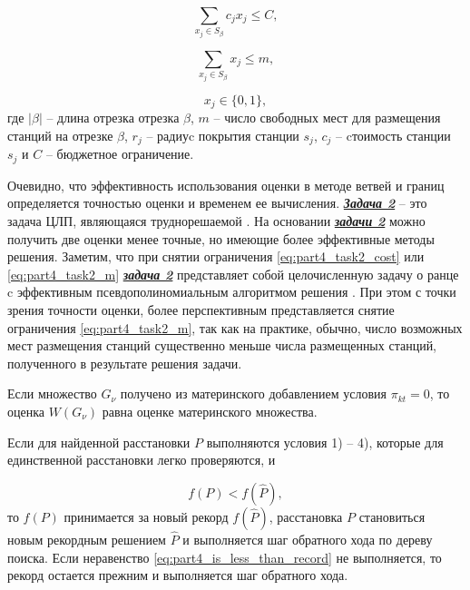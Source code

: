 \begin{equation}\label{eq:part4_task2_cost}
    \sum\limits_{x_j \in S_\beta} c_j x_j \leqslant C,
\end{equation}

\begin{equation}\label{eq:part4_task2_m}
    \sum\limits_{x_j \in S_\beta} x_j \leqslant m,
\end{equation}

\begin{displaymath}
    x_j \in \{0, 1\},
\end{displaymath}
где $|\beta|$ -- длина отрезка отрезка  $\beta$, $m$ -- число свободных мест для размещения станций на отрезке $\beta$, $r_j$ -- радиуc покрытия станции $s_j$, $c_j$ -- cтоимость станции $s_j$ и $C$ -- бюджетное ограничение.

Очевидно, что эффективность использования оценки в методе ветвей и границ определяется точностью оценки и временем ее вычисления. \underline{\textit{\textbf{Задача 2}}} -- это задача ЦЛП, являющаяся труднорешаемой \cite{Gari}. На основании \underline{\textit{\textbf{задачи 2}}} можно получить две оценки менее точные, но имеющие более эффективные методы решения. Заметим, что при снятии ограничения \cref{eq:part4_task2_cost} или \cref{eq:part4_task2_m} \underline{\textit{\textbf{задача 2}}} представляет собой целочисленную задачу о ранце c эффективным псевдополиномиальным алгоритмом решения \cite{Gari}. При этом с точки зрения точности оценки, более перспективным представляется снятие ограничения \cref{eq:part4_task2_m}, так как на практике, обычно, число возможных мест размещения станций существенно меньше числа размещенных станций, полученного в результате решения задачи. 

Если множество $G_\nu$ получено из материнского добавлением условия $\pi_{kt}=0$, то оценка $W(G_\nu)$ равна оценке материнского множества.

Если для найденной расстановки $P$ выполняются условия 1) – 4), которые для единственной расстановки легко проверяются, и

\begin{equation}
    \label{eq:part4_is_less_than_record}
    f(P) < f(\widehat{P}),
\end{equation}
то $f(P)$ принимается за новый рекорд $f(\widehat{P})$, расстановка $P$ становиться новым рекордным решением $\widehat{P}$ и выполняется шаг обратного хода по дереву поиска. Если неравенство \cref{eq:part4_is_less_than_record} не выполняется, то рекорд остается прежним и выполняется шаг обратного хода.

